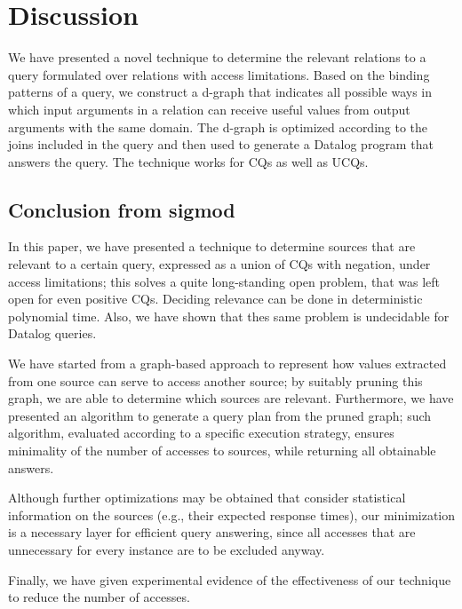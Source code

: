 \section{Discussion}\label{sec:discussion}

We have presented a novel technique to determine the relevant relations to a query formulated over relations with access limitations.
Based on the binding patterns of a query, we construct a d-graph that indicates all possible ways in which input arguments in a relation can receive useful values from output arguments with the same
domain. The d-graph is optimized according to the joins included in
the query and then used to generate a Datalog program that answers the
query. The technique works for CQs as well as UCQs.

\subsection{Conclusion from sigmod}
\label{sec:conclusion}

In this paper, we have presented a technique to determine sources that are
relevant to a certain query, expressed as a union of CQs with negation, under
access limitations; this solves a quite long-standing open problem, that was
left open for even positive CQs.  Deciding relevance can be done in deterministic
polynomial time.  Also, we have shown that thes same problem is undecidable for
Datalog queries.

We have started from a graph-based approach to represent how values extracted
from one source can serve to access another source; by suitably pruning this
graph, we are able to determine which sources are relevant.  Furthermore, we
have presented an algorithm to generate a query plan from the pruned graph;
such algorithm, evaluated according to a specific execution strategy, ensures
minimality of the number of accesses to sources, while returning all obtainable
answers.

Although further optimizations may be obtained that consider statistical
information on the sources (e.g., their expected response times), our
minimization is a necessary layer for efficient query answering, since all
accesses that are unnecessary for every instance are to be excluded anyway.

Finally, we have given experimental evidence of the effectiveness of our
technique to reduce the number of accesses.

